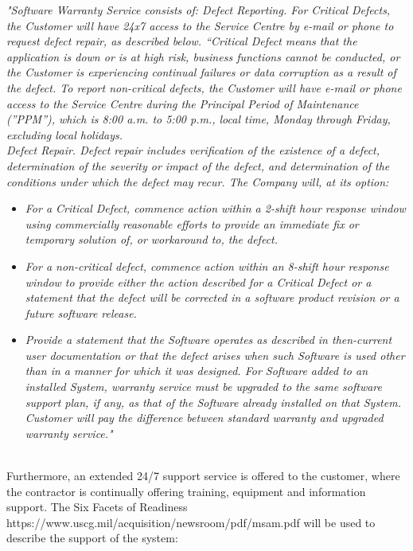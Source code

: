 \hfill\begin{minipage}{\dimexpr\textwidth-1cm}
\textit{"Software Warranty Service consists of:
Defect Reporting. For Critical Defects, the Customer will have 24x7 access to the Service Centre by e-mail or phone to request defect repair, as described below. “Critical Defect means that the application is down or is at high risk, business functions cannot be conducted, or the Customer is experiencing continual failures or data corruption as a result of the defect. To report non-critical defects, the Customer will have e-mail or phone access to the Service Centre during the Principal Period of Maintenance (”PPM”), which is 8:00 a.m. to 5:00 p.m., local time, Monday through Friday, excluding local holidays.} \\

\textit{Defect Repair. Defect repair includes verification of the existence of a defect, determination of the severity or impact of the defect, and determination of the conditions under which the defect may recur. The Company will, at its option:}
\begin{itemize}
	\itemsep0em
	\item \textit{For a Critical Defect, commence action within a 2-shift hour response window using  commercially reasonable efforts to provide an immediate fix or temporary solution of, or workaround to, the defect.}
	\item \textit{For a non-critical defect, commence action within an 8-shift hour response window to provide either the action described for a Critical Defect or a statement that the defect will be corrected in a software product revision or a future software release.}
	\item \textit{Provide a statement that the Software operates as described in then-current user documentation or that the defect arises when such Software is used other than in a manner for which it was designed. For Software added to an installed System, warranty service must be upgraded to the same software support plan, if any, as that of the Software already installed on that System. Customer will pay the difference between standard warranty and upgraded warranty service."}
\end{itemize}
\end{minipage} \\

\noindent Furthermore, an extended 24/7 support service is offered to the customer, where the contractor is continually offering training, equipment and information support.
The Six Facets of Readiness \cite{Six_facets} https://www.uscg.mil/acquisition/newsroom/pdf/msam.pdf will be used to describe the support of the system:

